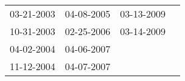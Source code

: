 \begin{supertabular}{llll}
 03-21-2003 &  04-08-2005 &  03-13-2009 \\
 10-31-2003 &  02-25-2006 &  03-14-2009 \\
 04-02-2004 &  04-06-2007 &             \\
 11-12-2004 &  04-07-2007 &             \\
\end{supertabular}
